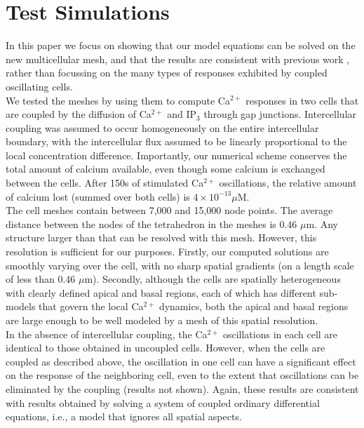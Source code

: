 \documentclass[a4paper,10pt]{article}
\begin{document}
\section{Test Simulations}
In this paper we focus on showing that our model equations can be solved on the new multicellular mesh, and that the results are consistent with previous work  \cite{Sneyd2017383}, rather than focussing on the many types of responses exhibited by coupled oscillating cells.\\

We tested the meshes by using them to compute Ca$^{2+}$ responses in two cells that are coupled by the diffusion of Ca$^{2+}$ and IP$_3$ through gap junctions. Intercellular coupling was assumed to occur homogeneously on the entire intercellular boundary, with the intercellular flux assumed to be linearly proportional to the local concentration difference.
Importantly, our numerical scheme  conserves the total amount of calcium available, even though some calcium is exchanged between the cells. After 150s of stimulated Ca$^{2+}$ oscillations, the relative amount of calcium lost (summed over both cells) is $4\times10^{-13} \mu$M.\\

The cell meshes contain between 7,000 and 15,000 node points. The average distance between the nodes of the tetrahedron in the meshes is 0.46 $\mu$m. Any structure larger than that can be resolved with this mesh. However, this resolution is sufficient for our purposes. Firstly, our computed solutions are smoothly varying over the cell, with no sharp spatial gradients (on a length scale of less than 0.46 $\mu$m). Secondly, although the cells are spatially heterogeneous with clearly defined apical and basal regions, each of which has different sub-models that govern the local Ca$^{2+}$ dynamics, both the apical and basal regions are large enough to be well modeled by a mesh of this spatial resolution.​\\

In the absence of intercellular coupling, the Ca$^{2+}$ oscillations in each cell are identical to those obtained in uncoupled cells. However, when the cells are coupled as described above, the oscillation in one cell can have a significant effect on the response of the neighboring cell, even to the extent that oscillations can be eliminated by the coupling (results not shown). Again, these results are consistent with results obtained by solving a system of coupled ordinary differential equations, i.e., a model that ignores all spatial aspects.\\
\end{document}
